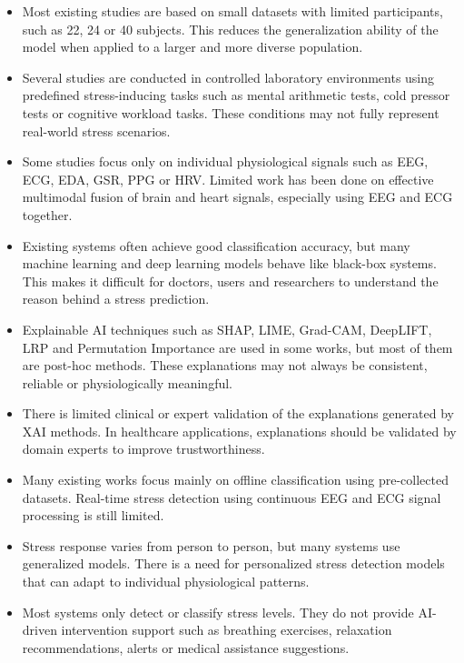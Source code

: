 \documentclass[12pt,a4paper]{report}
\begin{document}
\begin{itemize}
    \item Most existing studies are based on small datasets with limited participants, such as 22, 24 or 40 subjects. This reduces the generalization ability of the model when applied to a larger and more diverse population.

    \item Several studies are conducted in controlled laboratory environments using predefined stress-inducing tasks such as mental arithmetic tests, cold pressor tests or cognitive workload tasks. These conditions may not fully represent real-world stress scenarios.

    \item Some studies focus only on individual physiological signals such as EEG, ECG, EDA, GSR, PPG or HRV. Limited work has been done on effective multimodal fusion of brain and heart signals, especially using EEG and ECG together.

    \item Existing systems often achieve good classification accuracy, but many machine learning and deep learning models behave like black-box systems. This makes it difficult for doctors, users and researchers to understand the reason behind a stress prediction.

    \item Explainable AI techniques such as SHAP, LIME, Grad-CAM, DeepLIFT, LRP and Permutation Importance are used in some works, but most of them are post-hoc methods. These explanations may not always be consistent, reliable or physiologically meaningful.

    \item There is limited clinical or expert validation of the explanations generated by XAI methods. In healthcare applications, explanations should be validated by domain experts to improve trustworthiness.

    \item Many existing works focus mainly on offline classification using pre-collected datasets. Real-time stress detection using continuous EEG and ECG signal processing is still limited.

    \item Stress response varies from person to person, but many systems use generalized models. There is a need for personalized stress detection models that can adapt to individual physiological patterns.

    \item Most systems only detect or classify stress levels. They do not provide AI-driven intervention support such as breathing exercises, relaxation recommendations, alerts or medical assistance suggestions.


\end{itemize}
\end{document}
